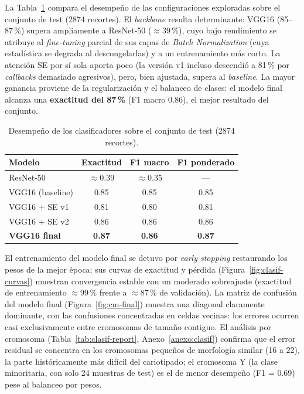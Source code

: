 \documentclass[11pt,a4paper]{article}
\begin{document}
La Tabla~\ref{tab:clasif-resultados} compara el desempeño de las configuraciones
exploradas sobre el conjunto de test (\num{2874} recortes). El \textit{backbone}
resulta determinante: VGG16 (85--87\,\%) supera ampliamente a ResNet-50
(\(\approx\)39\,\%), cuyo bajo rendimiento se atribuye al \textit{fine-tuning}
parcial de sus capas de \textit{Batch Normalization} (cuya estadística se degrada al
descongelarlas) y a un entrenamiento más corto. La atención SE por sí sola aporta
poco (la versión v1 incluso descendió a 81\,\% por \textit{callbacks} demasiado
agresivos), pero, bien ajustada, supera al \textit{baseline}. La mayor ganancia
proviene de la regularización y el balanceo de clases: el modelo final alcanza una
\textbf{exactitud del 87\,\%} (F1 macro 0.86), el mejor resultado del conjunto.

\begin{table}[H]
  \centering
  \small
  \caption{Desempeño de los clasificadores sobre el conjunto de test
  (\num{2874} recortes).}
  \label{tab:clasif-resultados}
  \begin{tabular}{lccc}
    \toprule
    Modelo & Exactitud & F1 macro & F1 ponderado \\
    \midrule
    ResNet-50                 & \(\approx\)0.39 & \(\approx\)0.35 & --- \\
    VGG16 (baseline)          & 0.85 & 0.85 & 0.85 \\
    VGG16 + SE v1             & 0.81 & 0.80 & 0.81 \\
    VGG16 + SE v2             & 0.86 & 0.86 & 0.86 \\
    \textbf{VGG16 final}      & \textbf{0.87} & \textbf{0.86} & \textbf{0.87} \\
    \bottomrule
  \end{tabular}
\end{table}

El entrenamiento del modelo final se detuvo por \textit{early stopping} restaurando
los pesos de la mejor época; sus curvas de exactitud y pérdida
(Figura~\ref{fig:clasif-curvas}) muestran convergencia estable con un moderado
sobreajuste (exactitud de entrenamiento \(\approx\)99\,\% frente a \(\approx\)87\,\%
de validación). La matriz de confusión del modelo final
(Figura~\ref{fig:cm-final}) muestra una diagonal claramente dominante, con las
confusiones concentradas en celdas vecinas: los errores ocurren casi exclusivamente
entre cromosomas de tamaño contiguo. El análisis por cromosoma
(Tabla~\ref{tab:clasif-report}, Anexo~\ref{anexo:clasif}) confirma que el error
residual se concentra en los cromosomas pequeños de morfología similar (16 a 22),
la parte históricamente más difícil del cariotipado; el cromosoma Y (la clase
minoritaria, con solo 24 muestras de test) es el de menor desempeño (F1 = 0.69)
pese al balanceo por pesos.
\end{document}
